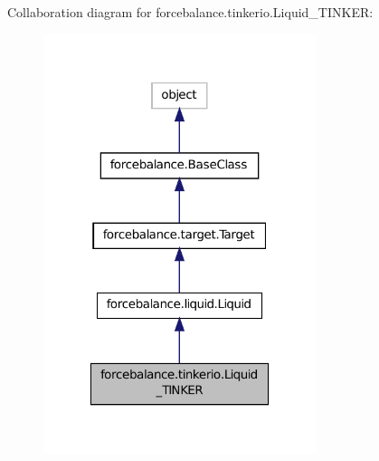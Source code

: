 Collaboration diagram for forcebalance.\-tinkerio.\-Liquid\-\_\-\-T\-I\-N\-K\-E\-R\-:
\nopagebreak
\begin{figure}[H]
\begin{center}
\leavevmode
\includegraphics[width=226pt]{classforcebalance_1_1tinkerio_1_1Liquid__TINKER__coll__graph}
\end{center}
\end{figure}
